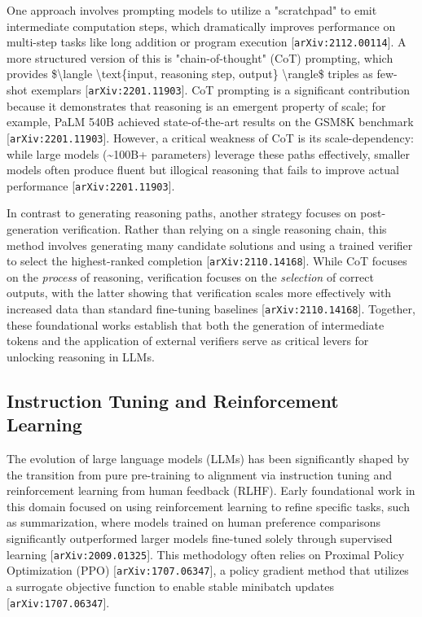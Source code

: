 \documentclass[11pt]{article}
\begin{document}
One approach involves prompting models to utilize a "scratchpad" to emit intermediate computation steps, which dramatically improves performance on multi-step tasks like long addition or program execution [\texttt{arXiv:2112.00114}]. A more structured version of this is "chain-of-thought" (CoT) prompting, which provides \$\textbackslash{}langle \textbackslash{}text\{input, reasoning step, output\} \textbackslash{}rangle\$ triples as few-shot exemplars [\texttt{arXiv:2201.11903}]. CoT prompting is a significant contribution because it demonstrates that reasoning is an emergent property of scale; for example, PaLM 540B achieved state-of-the-art results on the GSM8K benchmark [\texttt{arXiv:2201.11903}]. However, a critical weakness of CoT is its scale-dependency: while large models (\textasciitilde{}100B+ parameters) leverage these paths effectively, smaller models often produce fluent but illogical reasoning that fails to improve actual performance [\texttt{arXiv:2201.11903}].

In contrast to generating reasoning paths, another strategy focuses on post-generation verification. Rather than relying on a single reasoning chain, this method involves generating many candidate solutions and using a trained verifier to select the highest-ranked completion [\texttt{arXiv:2110.14168}]. While CoT focuses on the \textit{process} of reasoning, verification focuses on the \textit{selection} of correct outputs, with the latter showing that verification scales more effectively with increased data than standard fine-tuning baselines [\texttt{arXiv:2110.14168}]. Together, these foundational works establish that both the generation of intermediate tokens and the application of external verifiers serve as critical levers for unlocking reasoning in LLMs.

\subsection{Instruction Tuning and Reinforcement Learning}

The evolution of large language models (LLMs) has been significantly shaped by the transition from pure pre-training to alignment via instruction tuning and reinforcement learning from human feedback (RLHF). Early foundational work in this domain focused on using reinforcement learning to refine specific tasks, such as summarization, where models trained on human preference comparisons significantly outperformed larger models fine-tuned solely through supervised learning [\texttt{arXiv:2009.01325}]. This methodology often relies on Proximal Policy Optimization (PPO) [\texttt{arXiv:1707.06347}], a policy gradient method that utilizes a surrogate objective function to enable stable minibatch updates [\texttt{arXiv:1707.06347}].
\end{document}
